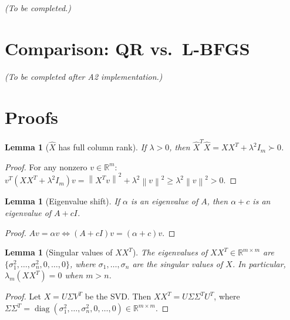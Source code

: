 \documentclass[11pt,a4paper]{article}
\newtheorem{lemma}[theorem]{Lemma}
\newcommand{\R}{\mathbb{R}}
\newcommand{\norm}[1]{\left\|#1\right\|}
\newcommand{\Xhat}{\hat{X}}
\DeclareMathOperator{\diag}{diag}
\begin{document}
\textit{(To be completed.)}


\section{Comparison: QR vs.\ L-BFGS}
\label{sec:comparison}

\textit{(To be completed after A2 implementation.)}


\appendix
\section{Proofs}

\begin{lemma}[$\Xhat$ has full column rank]
\label{lemma:fullrank}
If $\lambda > 0$, then $\Xhat^T\Xhat = XX^T + \lambda^2 I_m \succ 0$.
\end{lemma}
\begin{proof}
For any nonzero $v \in \R^m$:
$v^T(XX^T + \lambda^2 I_m)v = \norm{X^T v}^2 + \lambda^2\norm{v}^2 \geq \lambda^2\norm{v}^2 > 0.$
\end{proof}

\begin{lemma}[Eigenvalue shift]
\label{lemma:eigenvalues}
If $\alpha$ is an eigenvalue of $A$, then $\alpha + c$ is an eigenvalue of $A + cI$.
\end{lemma}
\begin{proof}
$Av = \alpha v \iff (A + cI)v = (\alpha + c)v.$
\end{proof}

\begin{lemma}[Singular values of $XX^T$]
\label{lemma:singvals}
The eigenvalues of $XX^T \in \R^{m \times m}$ are 
$\{\sigma_1^2, \ldots, \sigma_n^2, 0, \ldots, 0\}$, where $\sigma_1, \ldots, \sigma_n$ 
are the singular values of $X$. In particular, $\lambda_m(XX^T) = 0$ when $m > n$.
\end{lemma}
\begin{proof}
Let $X = U\Sigma V^T$ be the SVD. Then $XX^T = U\Sigma\Sigma^T U^T$, 
where $\Sigma\Sigma^T = \diag(\sigma_1^2, \ldots, \sigma_n^2, 0, \ldots, 0) \in \R^{m \times m}$.
\end{proof}
\end{document}
